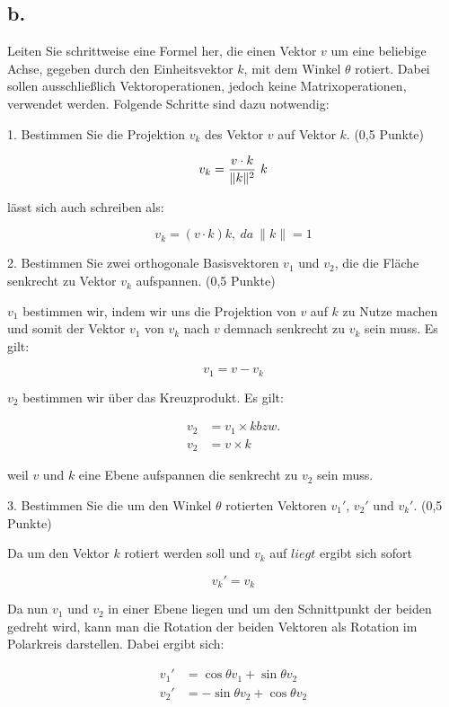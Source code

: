\documentclass[12pt]{scrreprt}
\begin{document}
\subsection*{b.}

Leiten Sie schrittweise eine Formel her, die einen Vektor $v$ um eine beliebige Achse, gegeben durch den
Einheitsvektor $k$, mit dem Winkel $\theta$ rotiert. Dabei sollen ausschließlich Vektoroperationen, jedoch keine
Matrixoperationen, verwendet werden. Folgende Schritte sind dazu notwendig:

1. Bestimmen Sie die Projektion $v_k$ des Vektor $v$ auf Vektor $k$. (0,5 Punkte)

\[
	v_k = {v \cdot k \over \|k\|^2}~k
\]

lässt sich auch schreiben als:

\[
	v_k = (v \cdot k)k, ~da ~\| k \| = 1
\]

2. Bestimmen Sie zwei orthogonale Basisvektoren $v_1$ und $v_2$, die die Fläche senkrecht zu Vektor $v_k$
aufspannen. (0,5 Punkte)

$v_1$ bestimmen wir, indem wir uns die Projektion von $v$ auf $k$ zu Nutze machen und somit der Vektor $v_1$ von $v_k$ nach $v$ demnach senkrecht zu $v_k$ sein muss. Es gilt:

\[
v_1 = v - v_k
\]

$v_2$ bestimmen wir über das Kreuzprodukt. Es gilt:

\begin{align*}
	v_2 &= v_1 \times k bzw.\\
	v_2 &= v \times k
\end{align*}

weil $v$ und $k$ eine Ebene aufspannen die senkrecht zu $v_2$ sein muss.

3. Bestimmen Sie die um den Winkel $\theta$ rotierten Vektoren $v_1'$, $v_2'$ und $v_k'$. (0,5 Punkte)

Da um den Vektor $k$ rotiert werden soll und $v_k$ auf $liegt$ ergibt sich sofort

\[
	v_k' = v_k
\]

Da nun $v_1$ und $v_2$ in einer Ebene liegen und um den Schnittpunkt der beiden gedreht wird, kann man die Rotation der beiden Vektoren als Rotation im Polarkreis darstellen. Dabei ergibt sich:

\begin{align*}
	v_1' &= \cos{\theta} v_1 + \sin{\theta} v_2\\
	v_2' &= -\sin{\theta} v_2 + \cos{\theta} v_2
\end{align*}
\end{document}

